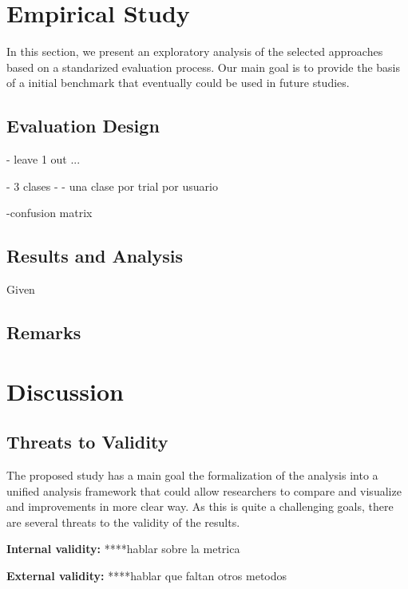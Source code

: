 \documentclass{sig-alternate}
\begin{document}
\cite{lecun1995convolutional}
\cite{zheng2014time}
\cite{stober2014using}
\cite{stober2014classifying}
\cite{xing2010brief}

\section{Empirical Study}
\label{study}

In this section, we present an  exploratory 
analysis of the selected approaches based on a standarized
evaluation process. Our main goal is to provide the basis
of a initial benchmark that eventually could be used in future
studies.

\subsection{ Evaluation Design} 


- leave 1 out ...

- 3 clases
 - 
- una clase por trial por  usuario

-confusion matrix 

\subsection{ Results and Analysis}

Given 



\subsection{Remarks}

\section{Discussion}
\label{discussion}

\subsection{Threats to Validity}

The proposed  study has a main goal the formalization
of the analysis into a unified analysis framework 
that could allow researchers to compare and
visualize and improvements in more clear way. 
As this is quite a challenging goals, there are several
threats to the validity of the results. 

\textbf{Internal validity: }  ****hablar sobre la metrica

\textbf{External validity: } ****hablar que faltan otros metodos
\end{document}

